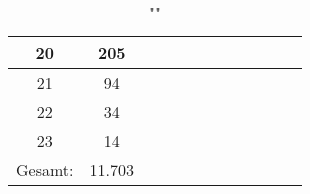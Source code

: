\begin{table}
\begin{tabular}{||c|c|c|c|c|c|c|c|c|c|c|c||}
        20      & 205    &    &    &    &    &    &    &    &    &     \\\hline
        21      & 94     &    &    &    &    &    &    &    &    &     \\\hline
        22      & 34     &    &    &    &    &    &    &    &    &     \\\hline
        23      & 14     &    &    &    &    &    &    &    &    &     \\\hline\hline
        Gesamt: & 11.703 &    &    &    &    &    &    &    &    &
    \end{tabular}
    \caption{""}
    \label{tab:upper-bound-table}
\end{table}
